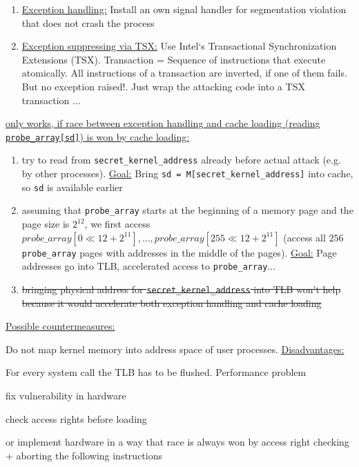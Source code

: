 \documentclass[landscape, a4paper]{article}
\begin{document}
\begin{minipage}[t]{0.2\linewidth}
\begin{betterlist}
\begin{enumerate}
			\item \underline{Exception handling:} Install an own signal handler for segmentation violation that does not crash the process
			\item \underline{Exception suppressing via TSX:} Use Intel‘s Transactional Synchronization Extensions (TSX). Transaction = Sequence of instructions that execute atomically. All instructions of a transaction are inverted, if one of them fails. But no exception raised!. Just wrap the attacking code into a TSX transaction ...
		\end{enumerate}
		\item \uline{only works, if race between exception handling and cache loading (reading \texttt{probe\_array[sd]}) is won by cache loading:}
		\begin{enumerate}
			\item try to read from \verb|secret_kernel_address| already before actual attack (e.g. by other processes). \underline{Goal:} Bring \verb|sd = M[secret_kernel_address]| into cache, so \verb|sd| is available earlier
			\item assuming that \verb|probe_array| starts at the beginning of a memory page and the page size is $2^{12}$, we first access $probe\_array[0 \ll 12 + 2^{11}], \ldots, probe\_array[255 \ll 12 + 2^{11}]$ (access all $256$ \verb|probe_array| pages with addresses in the middle of the pages). \underline{Goal:} Page addresses go into TLB, accelerated access to \verb|probe_array|...
			\item \sout{bringing physical address for \texttt{secret\_kernel\_address} into TLB won't help because it would accelerate both exception handling and cache loading}
		\end{enumerate}
		\item \underline{Possible countermeasures:}
		\begin{betterlist}
			\item Do not map kernel memory into address space of user processes. \underline{Disadvantages:}
			\begin{betterlist}
				\item For every system call the TLB has to be flushed. Performance problem
			\end{betterlist}
			\item fix vulnerability in hardware
			\begin{betterlist}
				\item check access rights before loading
				\item or implement hardware in a way that race is always won by access right checking + aborting the following instructions

\end{betterlist}
\end{betterlist}
\end{betterlist}
\end{minipage}
\end{document}
